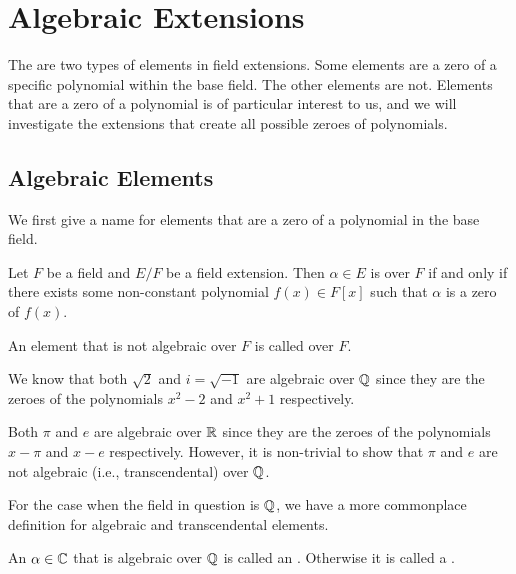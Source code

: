 \chapter{Algebraic Extensions}
The are two types of elements in field extensions. Some elements are a zero of a specific polynomial within the base field. The other elements are not. Elements that are a zero of a polynomial is of particular interest to us, and we will investigate the extensions that create all possible zeroes of polynomials.

\section{Algebraic Elements}
We first give a name for elements that are a zero of a polynomial in the base field.

\begin{definition}
    Let $F$ be a field and $E/F$ be a field extension. Then $\alpha \in E$ is  over $F$ if and only if there exists some non-constant polynomial $f(x) \in F[x]$ such that $\alpha$ is a zero of $f(x)$.

    An element that is not algebraic over $F$ is called  over $F$.
\end{definition}

\begin{example}
    We know that both $\sqrt2$ and $i = \sqrt{-1}$ are algebraic over $\mathbb{Q}$ since they are the zeroes of the polynomials $x^2 - 2$ and $x^2 + 1$ respectively.
\end{example}

\begin{example}
    Both $\pi$ and $e$ are algebraic over $\mathbb{R}$ since they are the zeroes of the polynomials $x - \pi$ and $x - e$ respectively. However, it is non-trivial to show that $\pi$ and $e$ are not algebraic (i.e., transcendental) over $\mathbb{Q}$.
\end{example}

For the case when the field in question is $\mathbb{Q}$, we have a more commonplace definition for algebraic and transcendental elements.

\begin{definition}
    An $\alpha \in \mathbb{C}$ that is algebraic over $\mathbb{Q}$ is called an . Otherwise it is called a .
\end{definition}

